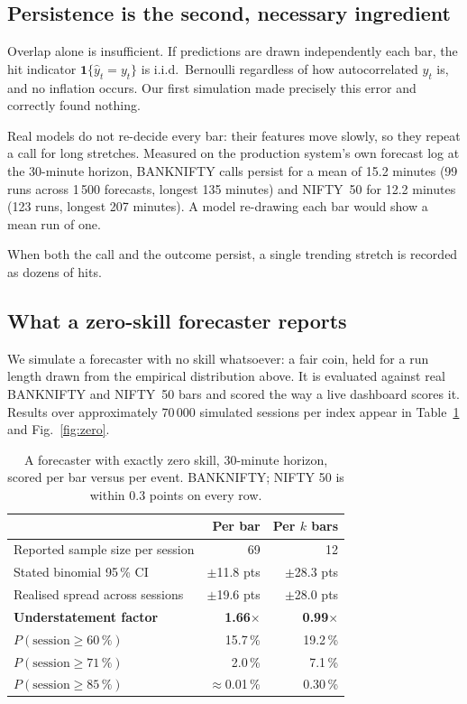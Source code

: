 \documentclass[conference]{IEEEtran}
\begin{document}
\subsection{Persistence is the second, necessary ingredient}

Overlap alone is insufficient. If predictions are drawn independently each bar,
the hit indicator $\mathbf{1}\{\hat{y}_t = y_t\}$ is i.i.d.\ Bernoulli
regardless of how autocorrelated $y_t$ is, and no inflation occurs. Our first
simulation made precisely this error and correctly found nothing.

Real models do not re-decide every bar: their features move slowly, so they
repeat a call for long stretches. Measured on the production system's own
forecast log at the 30-minute horizon, BANKNIFTY calls persist for a mean of
15.2 minutes (99 runs across 1\,500 forecasts, longest 135 minutes) and NIFTY~50
for 12.2 minutes (123 runs, longest 207 minutes). A model re-drawing each bar
would show a mean run of one.

When both the call and the outcome persist, a single trending stretch is
recorded as dozens of hits.

\subsection{What a zero-skill forecaster reports}

We simulate a forecaster with no skill whatsoever: a fair coin, held for a run
length drawn from the empirical distribution above. It is evaluated against real
BANKNIFTY and NIFTY~50 bars and scored the way a live dashboard scores it. Results over approximately
70\,000 simulated sessions per index appear in Table~\ref{tab:zero} and
Fig.~\ref{fig:zero}.

\begin{table}[!tb]
\caption{A forecaster with exactly zero skill, 30-minute horizon, scored
per bar versus per event. BANKNIFTY; NIFTY 50 is within 0.3 points on every row.}
\label{tab:zero}
\centering
\small
\begin{tabular}{@{}lrr@{}}
\toprule
 & \textbf{Per bar} & \textbf{Per $k$ bars} \\
\midrule
Reported sample size per session & 69 & 12 \\
Stated binomial 95\,\% CI & $\pm$11.8 pts & $\pm$28.3 pts \\
Realised spread across sessions & $\pm$19.6 pts & $\pm$28.0 pts \\
\textbf{Understatement factor} & \textbf{1.66$\times$} & \textbf{0.99$\times$} \\
\midrule
$P(\text{session} \geq 60\,\%)$ & 15.7\,\% & 19.2\,\% \\
$P(\text{session} \geq 71\,\%)$ & 2.0\,\% & 7.1\,\% \\
$P(\text{session} \geq 85\,\%)$ & $\approx$0.01\,\% & 0.30\,\% \\
\bottomrule
\end{tabular}
\end{table}
\end{document}
